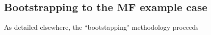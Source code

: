 \subsection{Bootstrapping to the MF example case}

As detailed elsewhere, the ``bootstapping" methodology proceeds